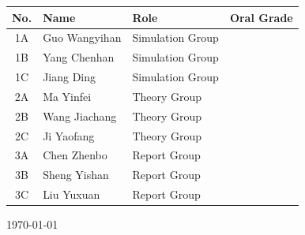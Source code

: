 \documentclass[11pt,a4paper]{article}
\begin{document}
\begin{titlepage}
    \renewcommand{\arraystretch}{1.45}
    \begin{tabular}{|c|l|l|c|}
        \hline
        \textbf{No.} & \textbf{Name} & \textbf{Role} & \textbf{Oral Grade} \\
        \hline
        1A & Guo Wangyihan & Simulation Group & \hspace{2.8cm} \\
        \hline
        1B & Yang Chenhan & Simulation Group & \hspace{2.8cm} \\
        \hline
        1C & Jiang Ding & Simulation Group & \hspace{2.8cm} \\
        \hline
        2A & Ma Yinfei & Theory Group & \hspace{2.8cm} \\
        \hline
        2B & Wang Jiachang & Theory Group & \hspace{2.8cm} \\
        \hline
        2C & Ji Yaofang & Theory Group & \hspace{2.8cm} \\
        \hline
        3A & Chen Zhenbo & Report Group & \hspace{2.8cm} \\
        \hline
        3B & Sheng Yishan & Report Group & \hspace{2.8cm} \\
        \hline
        3C & Liu Yuxuan & Report Group & \hspace{2.8cm} \\
        \hline
    \end{tabular}

    \vfill

    {\large \today \par}

\end{titlepage}
\end{document}
